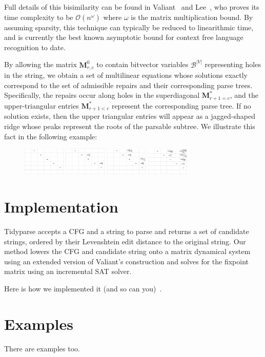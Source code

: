 \documentclass[sigplan,nonacm]{acmart}\settopmatter{printfolios=false,printccs=false,printacmref=false}
\begin{document}
Full details of this bisimilarity can be found in Valiant~\cite{valiant1975general} and Lee~\cite{lee2002fast}, who proves its time complexity to be $\mathcal{O}(n^\omega)$ where $\omega$ is the matrix multiplication bound. By assuming sparsity, this technique can typically be reduced to linearithmic time, and is currently the best known asymptotic bound for context free language recognition to date.

By allowing the matrix $\mathbf{M}^0_{r, c}$ to contain bitvector variables $\mathcal{B}^{|V|}$ representing holes in the string, we obtain a set of multilinear equations whose solutions exactly correspond to the set of admissible repairs and their corresponding parse trees. Specifically, the repairs occur along holes in the superdiagonal $\mathbf{M}^*_{r+1 = c}$, and the upper-triangular entries $\mathbf{M}^*_{r + 1 < c}$ represent the corresponding parse tree. If no solution exists, then the upper triangular entries will appear as a jagged-shaped ridge whose peaks represent the roots of the parsable subtree. We illustrate this fact in the following example:

\begin{figure}[H]
    \includegraphics[width=2cm]{../figures/parse1.png}
    \includegraphics[width=2cm]{../figures/parse2.png}
    \includegraphics[width=2cm]{../figures/parse3.png}
    \includegraphics[width=2cm]{../figures/parse4.png}
\end{figure}

\section{Implementation}

Tidyparse accepts a CFG and a string to parse and returns a set of candidate strings, ordered by their Levenshtein edit distance to the original string. Our method lowers the CFG and candidate string onto a matrix dynamical system using an extended version of Valiant's construction and solves for the fixpoint matrix using an incremental SAT solver.

    Here is how we implemented it (and so can you)~\cite{valiant1975general}.
\section{Examples}
    There are examples too.

\end{document}
